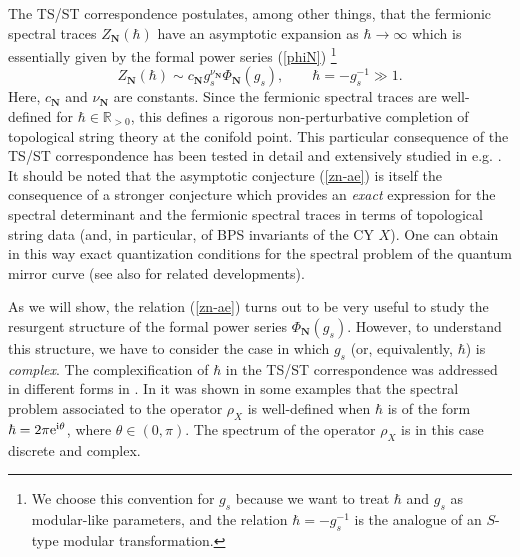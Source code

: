 \documentclass[a4paper,11pt]{article}
\theoremstyle{definition}
\def\IR{{\mathbb R}}
\newcommand{\re}{{\rm e}}
\newcommand{\ri}{{\rm i}}
\def\bN{{\boldsymbol{N}}}
\begin{document}
The TS/ST correspondence postulates, among other things, that the
fermionic spectral traces $ Z_{\bN}(\hbar) $ have an asymptotic
expansion as $\hbar \rightarrow \infty$ which is essentially given by
the formal power series (\ref{phiN}) \footnote{We choose this
  convention for $g_s$ because we want to treat $\hbar$ and $g_s$ as
  modular-like parameters, and the relation $\hbar = -g_s^{-1}$ is the
  analogue of an $S$-type modular transformation.\label{fn:gs}}
%
\begin{equation}
\label{zn-ae}
Z_{\bN}(\hbar) \sim c_{\bN} g_s^{\nu_{\bN}} \Phi_{\bN}(g_s), \qquad \hbar = -g_s^{-1} \gg 1. 
\end{equation}
%
Here, $c_{\bN}$ and $\nu_{\bN}$ are constants. Since the fermionic
spectral traces are well-defined for $\hbar \in \IR_{>0}$, this
defines a rigorous non-perturbative completion of topological string
theory at the conifold point. This particular consequence of the TS/ST
correspondence has been tested in detail and extensively studied in
e.g. \cite{kama,mz,kmz,cgm,cgum,cms}. It should be noted that the
asymptotic conjecture (\ref{zn-ae}) is itself the consequence of a
stronger conjecture which provides an {\it exact} expression for the
spectral determinant and the fermionic spectral traces in terms of
topological string data (and, in particular, of BPS invariants of the
CY $X$).  One can obtain in this way exact quantization conditions for
the spectral problem of the quantum mirror curve (see also \cite{wzh,
  hm,fhm,swh} for related developments).

As we will show, the relation (\ref{zn-ae}) turns out to be very
useful to study the resurgent structure of the formal power series
$\Phi_{\bN}(g_s)$. However, to understand this structure, we have to
consider the case in which $g_s$ (or, equivalently, $\hbar$) is {\it
  complex}.  The complexification of $\hbar$ in the TS/ST
correspondence was addressed in different forms in
\cite{kpamir,ks1,ks2, gm-complex}. In \cite{ks1, ks2} it was shown in
some examples that the spectral problem associated to the operator
$\rho_X$ is well-defined when $\hbar$ is of the form
$\hbar = 2 \pi \re^{\ri \theta}$, where $\theta \in (0, \pi)$. The
spectrum of the operator $\rho_X$ is in this case discrete and
complex.
\end{document}
